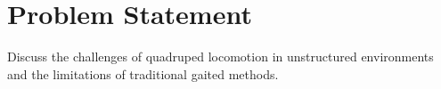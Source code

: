 \section{Problem Statement}

\begin{outline}
  Discuss the challenges of quadruped locomotion in unstructured
  environments and the limitations of traditional gaited methods.
\end{outline}
